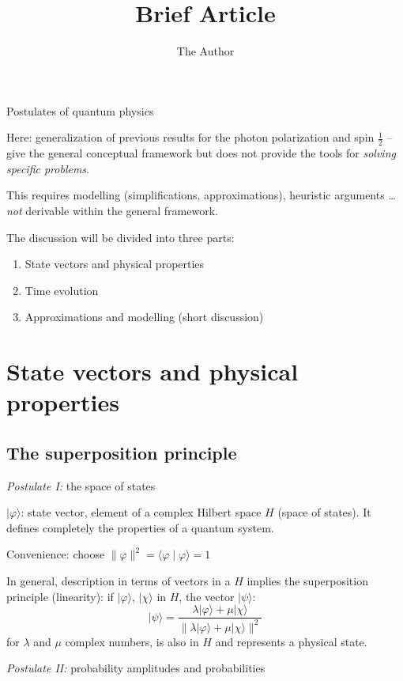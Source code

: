 \documentclass[12pt]{article}
\title{Brief Article}
\author{The Author}
\begin{document}
\maketitle

{Postulates of quantum physics}

Here: generalization of previous results for
the photon polarization and spin $\frac{1}{2}$
-- give the general conceptual framework
but does not provide the tools for
\emph{solving specific problems}.

This requires modelling (simplifications, approximations),
heuristic arguments \ldots \emph{not} derivable within the general framework.

The discussion will be divided into three parts:
\begin{enumerate}
\item State vectors and physical properties
\item Time evolution
\item Approximations and modelling (short discussion)
\end{enumerate}

\section{State vectors and physical properties}

\subsection{The superposition principle}

\emph{Postulate I:} the space of states

$|\varphi\rangle$: state vector, element of a complex Hilbert
space $H$ (space of states). It defines completely the properties of a quantum system.

Convenience: choose $\|\varphi \|^{2}=\langle\varphi \mid \varphi\rangle=1$

In general, description in terms of vectors in a $H$ implies the superposition principle (linearity): 
if $|\varphi\rangle$, $|\chi\rangle$ in $H$, the vector $|\psi\rangle$:
%
\begin{equation}
|\psi\rangle=\frac{\lambda|\varphi\rangle+\mu|\chi\rangle}{\| \lambda|\varphi\rangle+\mu|\chi\rangle \|^{2}}
\end{equation}
%
for $\lambda$ and $\mu$ complex numbers, is also in $H$ and represents a physical state.

\emph{Postulate II:} probability amplitudes and probabilities
\end{document}
